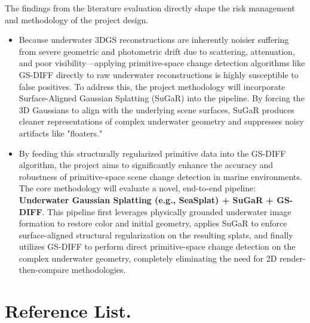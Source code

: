 \documentclass[12pt, a4paper]{article}
\begin{document}
The findings from the literature evaluation directly shape the risk management and methodology of the project design. 
\begin{itemize}
    \item Because underwater 3DGS reconstructions are inherently noisier suffering from severe geometric and photometric drift due to scattering, attenuation, and poor visibility—applying primitive-space change detection algorithms like GS-DIFF directly to raw underwater reconstructions is highly susceptible to false positives. To address this, the project methodology will incorporate Surface-Aligned Gaussian Splatting (SuGaR) into the pipeline. By forcing the 3D Gaussians to align with the underlying scene surfaces, SuGaR produces cleaner representations of complex underwater geometry and suppresses noisy artifacts like "floaters."
    \item By feeding this structurally regularized primitive data into the GS-DIFF algorithm, the project aims to significantly enhance the accuracy and robustness of primitive-space scene change detection in marine environments. The core methodology will evaluate a novel, end-to-end pipeline: \textbf{Underwater Gaussian Splatting (e.g., SeaSplat) + SuGaR + GS-DIFF}. This pipeline first leverages physically grounded underwater image formation to restore color and initial geometry, applies SuGaR to enforce surface-aligned structural regularization on the resulting splats, and finally utilizes GS-DIFF to perform direct primitive-space change detection on the complex underwater geometry, completely eliminating the need for 2D render-then-compare methodologies.
\end{itemize}

\section*{Reference List.}
\nocite{*}
 

\end{document}
